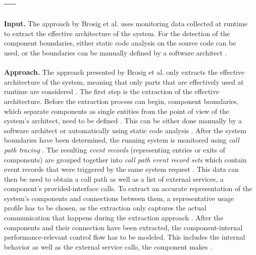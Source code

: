 \subsection{--- \cite{Brosig2011}}
\label{sec:Results:Brosig}
\textbf{Input.}
The approach by Brosig et al. uses monitoring data collected at runtime to extract the effective architecture \cite{Israr2007interaction} of the system.
For the detection of the component boundaries, either static code analysis on the source code can be used, or the boundaries can be manually defined by a software architect \cite{Brosig2011}.
\\ \\
\textbf{Approach.}
The approach presented by Brosig et al. only extracts the effective architecture \cite{Israr2007interaction} of the system, meaning that only parts that are effectively used at runtime are considered \cite{Brosig2011}.
The first step is the extraction of the effective architecture.
Before the extraction process can begin, component boundaries, which separate components as single entities from the point of view of the system's architect, need to be defined \cite{Brosig2011}.
This can be either done manually by a software architect or automatically using static code analysis \cite{Brosig2011}.
After the system boundaries have been determined, the running system is monitored using \textit{call path tracing}  \cite{Brosig2011}.
The resulting \textit{event records} (representing entries or exits of components) are grouped together into \textit{call path event record sets} which contain event records that were triggered by the same system request \cite{Brosig2011}.
This data can then be used to obtain a call path \cite{Brosig2011} as well as a list of external services, a component's provided-interface calls.
To extract an accurate representation of the system's components and connections between them, a representative usage profile has to be chosen, as the extraction only captures the actual communication that happens during the extraction approach \cite{Brosig2011}.
After the components and their connection have been extracted, the component-internal performance-relevant control flow has to be modeled.
This includes the internal behavior as well as the external service calls, the component makes \cite{Brosig2011}.

